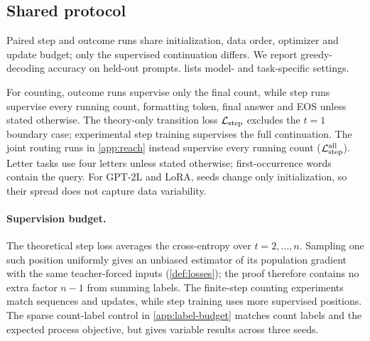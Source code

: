 \subsection{Shared protocol}
\label{app:letter-protocol}
Paired step and outcome runs share initialization, data order, optimizer and update budget; only the supervised continuation differs.
We report greedy-decoding accuracy on held-out prompts.  lists model- and task-specific settings.

\begin{table}[H]
\centering\small
{}
\caption{\textbf{Shared experimental settings.} Task-specific exceptions are stated in the corresponding subsections.}
\label{tab:protocol}
\end{table}

For counting, outcome runs supervise only the final count, while step runs supervise every running count, formatting token,
final answer and EOS unless stated otherwise. The theory-only transition loss $\mathcal L_{\mathrm{step}}$ excludes the $t=1$ boundary case;
experimental step training supervises the full continuation. The joint routing runs in \cref{app:reach} instead supervise
every running count ($\mathcal L_{\mathrm{step}}^{\mathrm{all}}$). Letter tasks use four letters unless stated otherwise; first-occurrence words contain the query.
For GPT-2L and LoRA, seeds change only initialization, so their spread does not capture data variability.

\paragraph{Supervision budget.}
The theoretical step loss averages the cross-entropy over $t=2,\ldots,n$.
Sampling one such position uniformly gives an unbiased estimator of its population
gradient with the same teacher-forced inputs (\cref{def:losses}); the proof therefore
contains no extra factor $n-1$ from summing labels. The finite-step counting experiments
match sequences and updates, while step training uses more supervised positions.
The sparse count-label control in \cref{app:label-budget} matches count labels
and the expected process objective, but gives variable results across three seeds.


